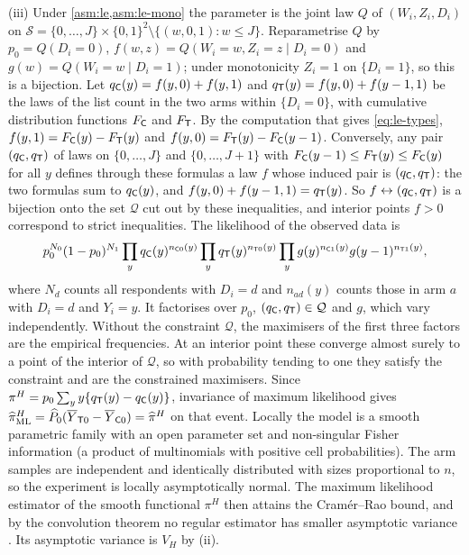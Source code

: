 (iii) Under \cref{asm:le,asm:le-mono} the parameter is the joint law $Q$ of $(W_i,Z_i,D_i)$ on $\mathcal S=\{0,\dots,J\}\times\{0,1\}^2\setminus\{(w,0,1):w\le J\}$. Reparametrise $Q$ by $p_0=Q(D_i=0)$, $f(w,z)=Q(W_i=w,Z_i=z\mid D_i=0)$ and $g(w)=Q(W_i=w\mid D_i=1)$; under monotonicity $Z_i=1$ on $\{D_i=1\}$, so this is a bijection. Let $q_{\mathsf{C}}(y)=f(y,0)+f(y,1)$ and $q_{\mathsf{T}}(y)=f(y,0)+f(y-1,1)$ be the laws of the list count in the two arms within $\{D_i=0\}$, with cumulative distribution functions $F_{\mathsf{C}}$ and $F_{\mathsf{T}}$. By the computation that gives \eqref{eq:le-types}, $f(y,1)=F_{\mathsf{C}}(y)-F_{\mathsf{T}}(y)$ and $f(y,0)=F_{\mathsf{T}}(y)-F_{\mathsf{C}}(y-1)$. Conversely, any pair $(q_{\mathsf{C}},q_{\mathsf{T}})$ of laws on $\{0,\dots,J\}$ and $\{0,\dots,J+1\}$ with $F_{\mathsf{C}}(y-1)\le F_{\mathsf{T}}(y)\le F_{\mathsf{C}}(y)$ for all $y$ defines through these formulas a law $f$ whose induced pair is $(q_{\mathsf{C}},q_{\mathsf{T}})$: the two formulas sum to $q_{\mathsf{C}}(y)$, and $f(y,0)+f(y-1,1)=q_{\mathsf{T}}(y)$. So $f\leftrightarrow(q_{\mathsf{C}},q_{\mathsf{T}})$ is a bijection onto the set $\mathcal Q$ cut out by these inequalities, and interior points $f>0$ correspond to strict inequalities. The likelihood of the observed data is
\[
  p_0^{N_0}(1-p_0)^{N_1}\prod_yq_{\mathsf{C}}(y)^{n_{\mathsf{C}0}(y)}\prod_yq_{\mathsf{T}}(y)^{n_{\mathsf{T}0}(y)}\prod_yg(y)^{n_{\mathsf{C}1}(y)}g(y-1)^{n_{\mathsf{T}1}(y)},
\]
where $N_d$ counts all respondents with $D_i=d$ and $n_{ad}(y)$ counts those in arm $a$ with $D_i=d$ and $Y_i=y$. It factorises over $p_0$, $(q_{\mathsf{C}},q_{\mathsf{T}})\in\mathcal Q$ and $g$, which vary independently. Without the constraint $\mathcal Q$, the maximisers of the first three factors are the empirical frequencies. At an interior point these converge almost surely to a point of the interior of $\mathcal Q$, so with probability tending to one they satisfy the constraint and are the constrained maximisers. Since $\pi^H=p_0\sum_yy\{q_{\mathsf{T}}(y)-q_{\mathsf{C}}(y)\}$, invariance of maximum likelihood gives $\widehat\pi^H_{\mathrm{ML}}=\widehat P_0(\overline Y_{\mathsf{T}0}-\overline Y_{\mathsf{C}0})=\widehat\pi^H$ on that event. Locally the model is a smooth parametric family with an open parameter set and non-singular Fisher information (a product of multinomials with positive cell probabilities). The arm samples are independent and identically distributed with sizes proportional to $n$, so the experiment is locally asymptotically normal. The maximum likelihood estimator of the smooth functional $\pi^H$ then attains the Cramér--Rao bound, and by the convolution theorem no regular estimator has smaller asymptotic variance \citep[chs.~7--8]{vandervaart1998}. Its asymptotic variance is $V_H$ by (ii).

